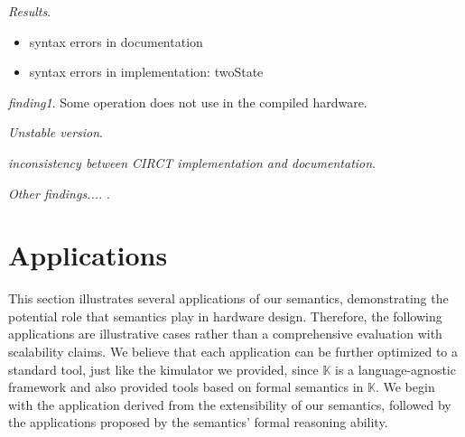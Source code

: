 


\smallskip
\textit{Results}.
\begin{itemize}
    \item syntax errors in documentation
    \item syntax errors in implementation: twoState
\end{itemize}

\smallskip
\textit{finding1}. Some operation does not use in the compiled hardware.

\smallskip
\textit{Unstable version}.

\smallskip
\textit{inconsistency between CIRCT implementation and documentation}.

\smallskip
\textit{Other findings.... }.



\section{Applications}

This section illustrates several applications of our semantics, demonstrating the potential role that semantics play in hardware design. Therefore, the following applications are illustrative cases rather than a comprehensive evaluation with scalability claims. We believe that each application can be further optimized to a standard tool, just like the kimulator we provided, since $\mathbb{K}$ is a language-agnostic framework and \cite{parkFormalVerificationTool2018,hathhornDefiningUndefinedness2015} also provided tools based on formal semantics in $\mathbb{K}$. We begin with the application derived from the extensibility of our semantics, followed by the applications proposed by the semantics' formal reasoning ability.

